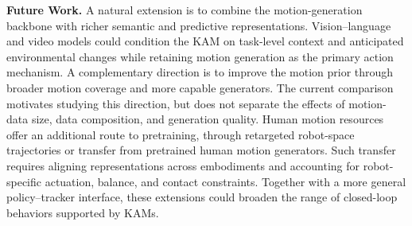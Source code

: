 \textbf{Future Work.} A natural extension is to combine the motion-generation backbone with richer semantic and predictive representations. Vision--language and video models could condition the KAM on task-level context and anticipated environmental changes while retaining motion generation as the primary action mechanism. A complementary direction is to improve the motion prior through broader motion coverage and more capable generators. The current comparison motivates studying this direction, but does not separate the effects of motion-data size, data composition, and generation quality. Human motion resources offer an additional route to pretraining, through retargeted robot-space trajectories or transfer from pretrained human motion generators. Such transfer requires aligning representations across embodiments and accounting for robot-specific actuation, balance, and contact constraints. Together with a more general policy--tracker interface, these extensions could broaden the range of closed-loop behaviors supported by KAMs.
